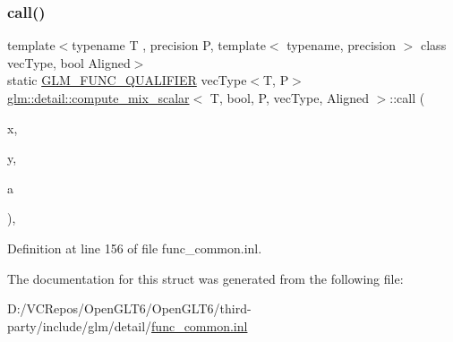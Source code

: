 \subsubsection{\texorpdfstring{call()}{call()}}
{\footnotesize\ttfamily template$<$typename T , precision P, template$<$ typename, precision $>$ class vec\+Type, bool Aligned$>$ \\
static \mbox{\hyperlink{setup_8hpp_a33fdea6f91c5f834105f7415e2a64407}{G\+L\+M\+\_\+\+F\+U\+N\+C\+\_\+\+Q\+U\+A\+L\+I\+F\+I\+ER}} vec\+Type$<$T, P$>$ \mbox{\hyperlink{structglm_1_1detail_1_1compute__mix__scalar}{glm\+::detail\+::compute\+\_\+mix\+\_\+scalar}}$<$ T, bool, P, vec\+Type, Aligned $>$\+::call (\begin{DoxyParamCaption}\item[{vec\+Type$<$ T, P $>$ const \&}]{x,  }\item[{vec\+Type$<$ T, P $>$ const \&}]{y,  }\item[{bool const \&}]{a }\end{DoxyParamCaption})\hspace{0.3cm}{\ttfamily [inline]}, {\ttfamily [static]}}



Definition at line 156 of file func\+\_\+common.\+inl.



The documentation for this struct was generated from the following file\+:\begin{DoxyCompactItemize}
\item 
D\+:/\+V\+C\+Repos/\+Open\+G\+L\+T6/\+Open\+G\+L\+T6/third-\/party/include/glm/detail/\mbox{\hyperlink{func__common_8inl}{func\+\_\+common.\+inl}}\end{DoxyCompactItemize}
